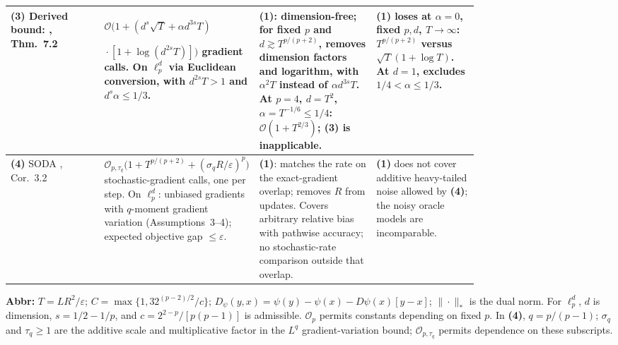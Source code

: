 \begin{table}[tp]
\begin{threeparttable}
\begin{tabularx}{\linewidth}{@{}>{\raggedright\arraybackslash}p{0.20\linewidth}>{\raggedright\arraybackslash}p{0.32\linewidth}>{\raggedright\arraybackslash}p{0.25\linewidth}>{\raggedright\arraybackslash}X@{}}
\midrule
\textbf{(3)} Derived bound: \citep{pgVasinGasnikov2026v1}, Thm.~7.2
& $\mathcal{O}\!\bigl(1+(d^s\sqrt T+\alpha d^{3s}T)$\par ${}\cdot[1+\log(d^{2s}T)]\bigr)$ gradient calls. On $\ell_p^d$ via Euclidean conversion, with $d^{2s}T>1$ and $d^s\alpha\le1/3$.
& \textbf{(1)}: dimension-free; for fixed $p$ and $d\gtrsim T^{p/(p+2)}$, removes dimension factors and logarithm, with $\alpha^2T$ instead of $\alpha d^{3s}T$. At $p=4$, $d=T^2$, $\alpha=T^{-1/6}\le1/4$: $\mathcal{O}(1+T^{2/3})$; \textbf{(3)} is inapplicable.
& \textbf{(1)} loses at $\alpha=0$, fixed $p,d$, $T\to\infty$: $T^{p/(p+2)}$ versus $\sqrt T(1+\log T)$. At $d=1$, excludes $1/4<\alpha\le1/3$. \\
\midrule
\textbf{(4)} SODA \citep{pgPethick2026v1}, Cor.~3.2
& $\mathcal{O}_{p,\tau_q}\!\bigl(1+T^{p/(p+2)}+(\sigma_qR/\varepsilon)^p\bigr)$ stochastic-gradient calls, one per step. On $\ell_p^d$: unbiased gradients with $q$-moment gradient variation (Assumptions~3--4); expected objective gap $\le\varepsilon$.
& \textbf{(1)}: matches the rate on the exact-gradient overlap; removes $R$ from updates. Covers arbitrary relative bias with pathwise accuracy; no stochastic-rate comparison outside that overlap.
& \textbf{(1)} does not cover additive heavy-tailed noise allowed by \textbf{(4)}; the noisy oracle models are incomparable. \\
\bottomrule
\end{tabularx}
\begin{tablenotes}[flushleft]\footnotesize
\item[] \textbf{Abbr:} $T=LR^2/\varepsilon$; $C=\max\{1,32^{(p-2)/2}/c\}$; $D_\psi(y,x)=\psi(y)-\psi(x)-D\psi(x)[y-x]$; $\|\cdot\|_*$ is the dual norm. For $\ell_p^d$, $d$ is dimension, $s=1/2-1/p$, and $c=2^{2-p}/[p(p-1)]$ is admissible. $\mathcal{O}_p$ permits constants depending on fixed $p$. In \textbf{(4)}, $q=p/(p-1)$; $\sigma_q$ and $\tau_q\ge1$ are the additive scale and multiplicative factor in the $L^q$ gradient-variation bound; $\mathcal{O}_{p,\tau_q}$ permits dependence on these subscripts.
\end{tablenotes}
\end{threeparttable}
\end{table}
\clearpage
